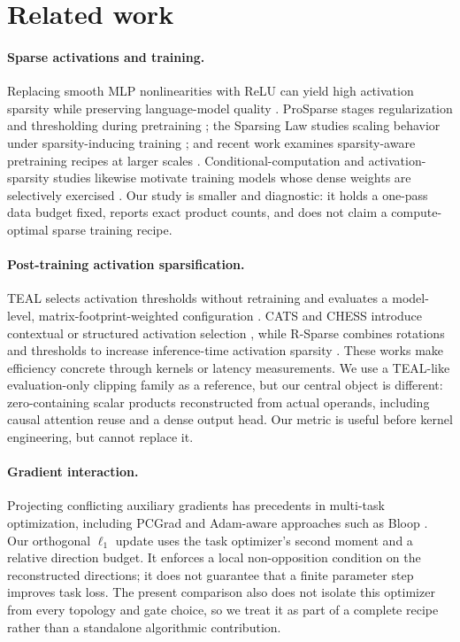 \section{Related work}
\label{sec:related}

\paragraph{Sparse activations and training.}
Replacing smooth MLP nonlinearities with ReLU can yield high activation
sparsity while preserving language-model quality \citep{mirzadeh2023relu}.
ProSparse stages regularization and thresholding during pretraining
\citep{song2024prosparse}; the Sparsing Law studies scaling behavior under
sparsity-inducing training \citep{liu2024sparsing}; and recent work examines
sparsity-aware pretraining recipes at larger scales \citep{cetin2026sparser}.
Conditional-computation and activation-sparsity studies likewise motivate
training models whose dense weights are selectively exercised
\citep{zhang2024exploring}.  Our study is smaller and diagnostic: it holds a
one-pass data budget fixed, reports exact product counts, and does not claim a
compute-optimal sparse training recipe.

\paragraph{Post-training activation sparsification.}
TEAL selects activation thresholds without retraining and evaluates a
model-level, matrix-footprint-weighted configuration \citep{liu2024teal}.
CATS and CHESS introduce contextual or structured activation selection
\citep{lee2024cats,zhang2024chess}, while R-Sparse combines rotations and
thresholds to increase inference-time activation sparsity
\citep{sun2025rsparse}.  These works make efficiency concrete through kernels
or latency measurements.  We use a TEAL-like evaluation-only clipping family
as a reference, but our central object is different: zero-containing scalar
products reconstructed from actual operands, including causal attention reuse
and a dense output head.  Our metric is useful before kernel engineering, but
cannot replace it.

\paragraph{Gradient interaction.}
Projecting conflicting auxiliary gradients has precedents in multi-task
optimization, including PCGrad \citep{yu2020pcgrad} and Adam-aware approaches
such as Bloop \citep{mitrevski2024bloop}.  Our orthogonal $\ell_1$ update uses
the task optimizer's second moment and a relative direction budget.  It enforces
a local non-opposition condition on the reconstructed directions; it does not
guarantee that a finite parameter step improves task loss.  The present
comparison also does not isolate this optimizer from every topology and gate
choice, so we treat it as part of a complete recipe rather than a standalone
algorithmic contribution.

